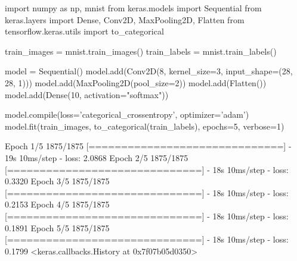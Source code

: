 \begin{ipython}
import numpy as np, mnist
from keras.models import Sequential
from keras.layers import Dense, Conv2D, MaxPooling2D, Flatten
from tensorflow.keras.utils import to_categorical

train_images = mnist.train_images() 
train_labels = mnist.train_labels() 

model = Sequential()
model.add(Conv2D(8, kernel_size=3, input_shape=(28, 28, 1)))
model.add(MaxPooling2D(pool_size=2))
model.add(Flatten())
model.add(Dense(10, activation="softmax"))

model.compile(loss='categorical_crossentropy', optimizer='adam')
model.fit(train_images, to_categorical(train_labels), epochs=5, verbose=1)
\end{ipython}
\begin{ioutput}
Epoch 1/5
1875/1875 [==============================] - 19s 10ms/step - loss: 2.0868
Epoch 2/5
1875/1875 [==============================] - 18s 10ms/step - loss: 0.3320
Epoch 3/5
1875/1875 [==============================] - 18s 10ms/step - loss: 0.2153
Epoch 4/5
1875/1875 [==============================] - 18s 10ms/step - loss: 0.1891
Epoch 5/5
1875/1875 [==============================] - 18s 10ms/step - loss: 0.1799
<keras.callbacks.History at 0x7f07b05d0350>
\end{ioutput}

